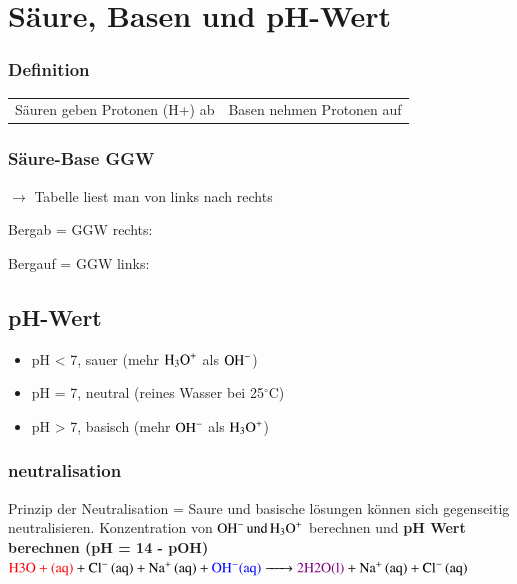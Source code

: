 \section{Säure, Basen und pH-Wert}

\subsubsection{Definition}
\begin{tabular} {l l}
 Säuren geben Protonen (H+) ab & Basen nehmen Protonen auf \\
\end{tabular}

\subsubsection{Säure-Base GGW}
$\rightarrow$ Tabelle liest man von links nach rechts \newline
\begin{minipage}{0.65\columnwidth}
	Bergab = GGW rechts: 
	
	Bergauf = GGW links: 
\end{minipage}

\subsection{pH-Wert}
\begin{itemize}
	\item pH < 7, sauer (mehr $\ce{H3O^+}$ als $\ce{OH^-}$)
	\item pH = 7, neutral (reines Wasser bei 25$^{\circ}$C)
	\item pH > 7, basisch (mehr $\ce{OH^-}$ als $\ce{H3O^+}$)
\end{itemize}
\subsubsection{neutralisation}
Prinzip der Neutralisation = Saure und basische lösungen können sich gegenseitig neutralisieren. \newline
Konzentration von $\ce{OH^- und H3O^+}$ berechnen und \textbf{pH Wert berechnen (pH = 14 - pOH)} \newline
$\ce{
	\textcolor{red}{H3O+ (aq)} + Cl^- (aq) + Na+ (aq) + \textcolor{blue}{OH^- (aq)}
	-> \textcolor{violet}{2 H2O (l)} + Na+ (aq) + Cl^- (aq)
}$


